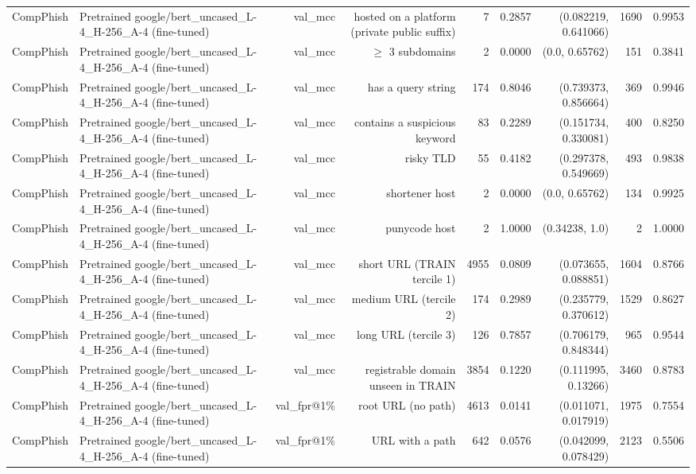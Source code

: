 \begin{table}[t]
\begin{tabular}{llrrrrrrr}
CompPhish & Pretrained google/bert\_uncased\_L-4\_H-256\_A-4 (fine-tuned) & val\_mcc & hosted on a platform (private public suffix) & 7 & 0.2857 & (0.082219, 0.641066) & 1690 & 0.9953 \\
CompPhish & Pretrained google/bert\_uncased\_L-4\_H-256\_A-4 (fine-tuned) & val\_mcc & $\geq$ 3 subdomains & 2 & 0.0000 & (0.0, 0.65762) & 151 & 0.3841 \\
CompPhish & Pretrained google/bert\_uncased\_L-4\_H-256\_A-4 (fine-tuned) & val\_mcc & has a query string & 174 & 0.8046 & (0.739373, 0.856664) & 369 & 0.9946 \\
CompPhish & Pretrained google/bert\_uncased\_L-4\_H-256\_A-4 (fine-tuned) & val\_mcc & contains a suspicious keyword & 83 & 0.2289 & (0.151734, 0.330081) & 400 & 0.8250 \\
CompPhish & Pretrained google/bert\_uncased\_L-4\_H-256\_A-4 (fine-tuned) & val\_mcc & risky TLD & 55 & 0.4182 & (0.297378, 0.549669) & 493 & 0.9838 \\
CompPhish & Pretrained google/bert\_uncased\_L-4\_H-256\_A-4 (fine-tuned) & val\_mcc & shortener host & 2 & 0.0000 & (0.0, 0.65762) & 134 & 0.9925 \\
CompPhish & Pretrained google/bert\_uncased\_L-4\_H-256\_A-4 (fine-tuned) & val\_mcc & punycode host & 2 & 1.0000 & (0.34238, 1.0) & 2 & 1.0000 \\
CompPhish & Pretrained google/bert\_uncased\_L-4\_H-256\_A-4 (fine-tuned) & val\_mcc & short URL (TRAIN tercile 1) & 4955 & 0.0809 & (0.073655, 0.088851) & 1604 & 0.8766 \\
CompPhish & Pretrained google/bert\_uncased\_L-4\_H-256\_A-4 (fine-tuned) & val\_mcc & medium URL (tercile 2) & 174 & 0.2989 & (0.235779, 0.370612) & 1529 & 0.8627 \\
CompPhish & Pretrained google/bert\_uncased\_L-4\_H-256\_A-4 (fine-tuned) & val\_mcc & long URL (tercile 3) & 126 & 0.7857 & (0.706179, 0.848344) & 965 & 0.9544 \\
CompPhish & Pretrained google/bert\_uncased\_L-4\_H-256\_A-4 (fine-tuned) & val\_mcc & registrable domain unseen in TRAIN & 3854 & 0.1220 & (0.111995, 0.13266) & 3460 & 0.8783 \\
CompPhish & Pretrained google/bert\_uncased\_L-4\_H-256\_A-4 (fine-tuned) & val\_fpr@1\% & root URL (no path) & 4613 & 0.0141 & (0.011071, 0.017919) & 1975 & 0.7554 \\
CompPhish & Pretrained google/bert\_uncased\_L-4\_H-256\_A-4 (fine-tuned) & val\_fpr@1\% & URL with a path & 642 & 0.0576 & (0.042099, 0.078429) & 2123 & 0.5506 \\

\end{tabular}
\end{table}

